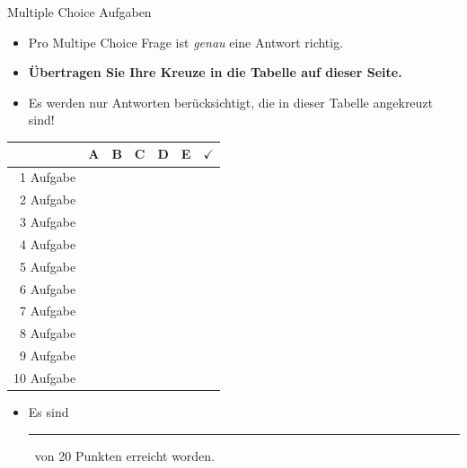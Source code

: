 \documentclass[a4paper, 10pt]{scrartcl}\usepackage[]{graphicx}\usepackage[]{xcolor}
\begin{document}
\begin{graybox}{Multiple Choice Aufgaben}
  \begin{itemize}
  \item Pro Multipe Choice Frage ist \emph{genau} eine Antwort richtig.
  \item \textbf{{\"U}bertragen Sie Ihre Kreuze in die Tabelle auf
      dieser Seite.}
  \item Es werden nur Antworten ber{\"u}cksichtigt, die in dieser Tabelle
    angekreuzt sind!
  \end{itemize}

\begin{center}
  \large
  \begin{tabular}{|r|c|c|c|c|c||c|}
    \hline
    & \textbf{A} & \textbf{B} & \textbf{C} & \textbf{D} & \textbf{E} & $\boldsymbol{\checkmark}$\strut\\
    \hline
    1 Aufgabe &   &   &   &   &   & \strut\\
    \hline
    2 Aufgabe &   &   &   &   &   & \strut\\
    \hline
    3 Aufgabe &   &   &   &   &   & \strut\\
    \hline
    4 Aufgabe &   &   &   &   &   & \strut\\
    \hline
    5 Aufgabe &   &   &   &   &   & \strut\\
    \hline
    6 Aufgabe &   &   &   &   &   & \strut\\
    \hline
    7 Aufgabe &   &   &   &   &   & \strut\\
    \hline
    8 Aufgabe &   &   &   &   &   & \strut\\
    \hline
    9 Aufgabe &   &   &   &   &   & \strut\\
    \hline
    10 Aufgabe &   &   &   &   &   & \strut\\
    \hline
  \end{tabular}
\end{center}

\begin{itemize}
\item Es sind \rule[0ex]{2em}{.4pt}\, von 20 Punkten erreicht worden.
\end{itemize}
\end{graybox}

\vfill
\end{document}
